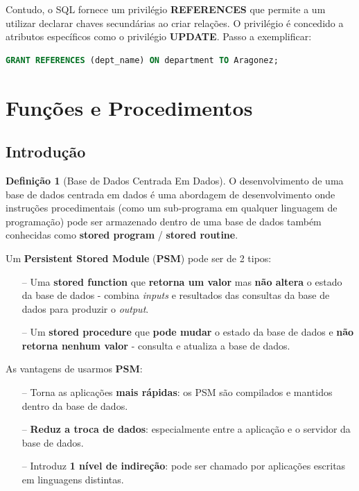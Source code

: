 \documentclass[oneside]{book}
\theoremstyle{definition}
\newtheorem{definition}{Definição}
\begin{document}
Contudo, o SQL fornece um privilégio \textbf{REFERENCES} que permite a um utilizar declarar chaves secundárias ao criar relações. O privilégio é concedido a atributos específicos como o privilégio \textbf{UPDATE}. Passo a exemplificar:
\begin{lstlisting}[language=SQL, morekeywords={REFERENCES, TO}, framesep=8pt, xleftmargin=40pt, framexleftmargin=40pt, frame=tb, framerule=0pt]
GRANT REFERENCES (dept_name) ON department TO Aragonez;
\end{lstlisting}

\section{Funções e Procedimentos}
\subsection{Introdução}
\begin{definition}[Base de Dados Centrada Em Dados]
    O desenvolvimento de uma base de dados centrada em dados é uma abordagem de desenvolvimento onde instruções procedimentais (como um sub-programa em qualquer linguagem de programação) pode ser armazenado dentro de uma base de dados também conhecidas como \textbf{stored program} / \textbf{stored routine}.
\end{definition}

Um \textbf{Persistent Stored Module} (\textbf{PSM}) pode ser de 2 tipos:
\begin{itemize}
    \item[--] Uma \textbf{stored function} que \textbf{retorna um valor} mas \textbf{não altera} o estado da base de dados - combina \textit{inputs} e resultados das consultas da base de dados para produzir o \textit{output}.
    \item[--] Um \textbf{stored procedure} que \textbf{pode mudar} o estado da base de dados e \textbf{não retorna nenhum valor} - consulta e atualiza a base de dados.
\end{itemize}

As vantagens de usarmos \textbf{PSM}:
\begin{itemize}
    \item[--] Torna as aplicações \textbf{mais rápidas}: os PSM são compilados e mantidos dentro da base de dados.
    \item[--] \textbf{Reduz a troca de dados}: especialmente entre a aplicação e o servidor da base de dados.
    \item[--] Introduz \textbf{1 nível de indireção}: pode ser chamado por aplicações escritas em linguagens distintas.
\end{itemize}
\end{document}
